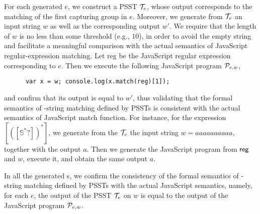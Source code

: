For each generated {\regexp} $e$, we construct a PSST $\mathcal{T}_e$, whose output corresponds to the matching of the first capturing group in $e$.  Moreover, we generate from $\mathcal{T}_e$ an input string $w$ as well as the corresponding output $w'$. We require that the length of $w$ is no less than some threshold (e.g., $10$), in order to avoid the empty string and facilitate a  meaningful comparison with the actual semantics of JavaScript regular-expression matching. 
Let {\sf reg} be the JavaScript regular expression corresponding to $e$. Then we execute the following JavaScript program $\mathcal{P}_{e,w}$,
\begin{center}
{
\small
\begin{verbatim}
      var x = w; console.log(x.match(reg)[1]);
\end{verbatim}
}
\end{center}
and confirm that its output is equal to $w'$, thus validating that the formal semantics of  \regexp-string matching defined by PSSTs is consistent with the actual semantics of JavaScript {\sf match} function. For instance, for the {\regexp} expression $[([\mathbb{S}^*?])^{*}]$, we generate from the $\mathcal{T}_e$ the input string $w= aaaaaaaaaa$, together with the output $a$. Then we generate  the JavaScript program from ${\sf reg}$ and $w$, execute it, and obtain the same output $a$.

In all the generated {\regexp}s, we confirm the consistency of the formal semantics of  \regexp-string matching defined by PSSTs with the actual JavaScript semantics, namely, for each {\regexp}  $e$, the output of the PSST $\mathcal{T}_e$ on $w$ is equal to the output of the JavaScript program $\mathcal{P}_{e,w}$.